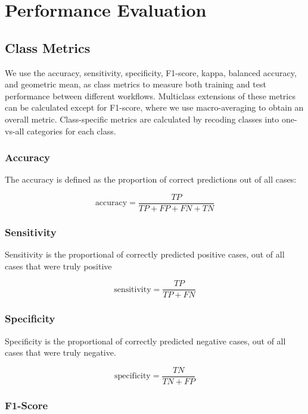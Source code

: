 \documentclass[
]{report}
\begin{document}
\section{Performance Evaluation}\label{performance-evaluation}

\subsection{Class Metrics}\label{class-metrics}

We use the accuracy, sensitivity, specificity, F1-score, kappa, balanced accuracy, and geometric mean, as class metrics to measure both training and test performance between different workflows. Multiclass extensions of these metrics can be calculated except for F1-score, where we use macro-averaging to obtain an overall metric. Class-specific metrics are calculated by recoding classes into one-vs-all categories for each class.

\subsubsection{Accuracy}\label{accuracy}

The accuracy is defined as the proportion of correct predictions out of all cases:

\[
\text{accuracy} = \frac{TP}{TP + FP + FN + TN}
\label{eq:accuracy}
\]

\subsubsection{Sensitivity}\label{sensitivity}

Sensitivity is the proportional of correctly predicted positive cases, out of all cases that were truly positive

\[
\text{sensitivity} = \frac{TP}{TP + FN}
\label{eq:sens}
\]

\subsubsection{Specificity}\label{specificity}

Specificity is the proportional of correctly predicted negative cases, out of all cases that were truly negative.

\[
\text{specificity} = \frac{TN}{TN + FP}
\label{eq:spec}
\]

\subsubsection{F1-Score}\label{f1-score}
\end{document}
